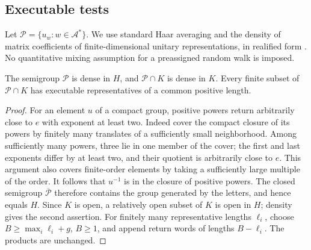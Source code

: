 \subsection{Executable tests}
Let $\mathcal P=\{u_w:w\in\mathcal A^*\}$. We use standard Haar averaging and the density of matrix coefficients of finite-dimensional unitary representations, in realified form \cite{Folland}. No quantitative mixing assumption for a preassigned random walk is imposed.

\begin{lemma}\label{lem:positive54}
The semigroup $\mathcal P$ is dense in $H$, and $\mathcal P\cap K$ is dense in $K$. Every finite subset of $\mathcal P\cap K$ has executable representatives of a common positive length.
\end{lemma}
\begin{proof}
For an element $u$ of a compact group, positive powers return arbitrarily close to $e$ with exponent at least two. Indeed cover the compact closure of its powers by finitely many translates of a sufficiently small neighborhood. Among sufficiently many powers, three lie in one member of the cover; the first and last exponents differ by at least two, and their quotient is arbitrarily close to $e$. This argument also covers finite-order elements by taking a sufficiently large multiple of the order. It follows that $u^{-1}$ is in the closure of positive powers. The closed semigroup $\overline{\mathcal P}$ therefore contains the group generated by the letters, and hence equals $H$. Since $K$ is open, a relatively open subset of $K$ is open in $H$; density gives the second assertion. For finitely many representative lengths $\ell_i$, choose $B\ge\max_i\ell_i+g$, $B\ge1$, and append return words of lengths $B-\ell_i$. The products are unchanged.
\end{proof}

